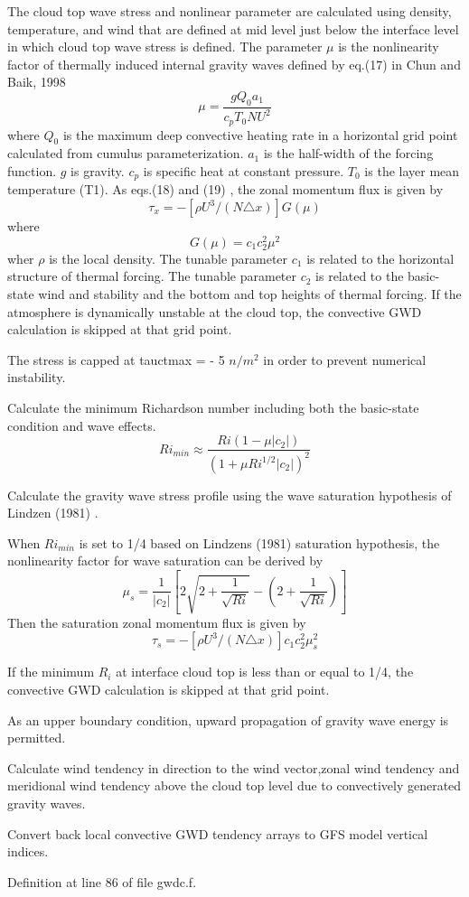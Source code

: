 \begin{DoxyEnumerate}
\begin{DoxyItemize}
\item The cloud top wave stress and nonlinear parameter are calculated using density, temperature, and wind that are defined at mid level just below the interface level in which cloud top wave stress is defined. The parameter $\mu$ is the nonlinearity factor of thermally induced internal gravity waves defined by eq.(17) in Chun and Baik, 1998 \cite{chun_and_baik_1998} \[ \mu=\frac{gQ_{0}a_{1}}{c_{p}T_{0}NU^{2}} \] where $Q_{0}$ is the maximum deep convective heating rate in a horizontal grid point calculated from cumulus parameterization. $a_{1}$ is the half-\/width of the forcing function. $g$ is gravity. $c_{p}$ is specific heat at constant pressure. $T_{0}$ is the layer mean temperature (T1). As eqs.(18) and (19) \cite{chun_and_baik_1998}, the zonal momentum flux is given by \[ \tau_{x}=-[\rho U^{3}/(N\triangle x)]G(\mu) \] where \[ G(\mu)=c_{1}c_2^2 \mu^{2} \] wher $\rho$ is the local density. The tunable parameter $c_1$ is related to the horizontal structure of thermal forcing. The tunable parameter $c_2$ is related to the basic-\/state wind and stability and the bottom and top heights of thermal forcing. If the atmosphere is dynamically unstable at the cloud top, the convective G\+WD calculation is skipped at that grid point.
\item The stress is capped at tauctmax = -\/ 5 $n/m^2$ in order to prevent numerical instability.
\end{DoxyItemize}
\item Calculate the minimum Richardson number including both the basic-\/state condition and wave effects. \[ Ri_{min}\approx\frac{Ri(1-\mu|c_{2}|)}{(1+\mu Ri^{1/2}|c_{2}|)^{2}} \]
\item Calculate the gravity wave stress profile using the wave saturation hypothesis of Lindzen (1981) \cite{lindzen_1981}.
\begin{DoxyItemize}
\item When $Ri_{min}$ is set to 1/4 based on Lindzen\textquotesingle{}s (1981) \cite{lindzen_1981} saturation hypothesis, the nonlinearity factor for wave saturation can be derived by \[ \mu_{s}=\frac{1}{|c_{2}|}[2\sqrt{2+\frac{1}{\sqrt{Ri}}}-(2+\frac{1}{\sqrt{Ri}})] \] Then the saturation zonal momentum flux is given by \[ \tau_{s}=-[\rho U^{3}/(N\triangle x)]c_{1}c_2^2\mu_s^2 \]
\item If the minimum $R_{i}$ at interface cloud top is less than or equal to 1/4, the convective G\+WD calculation is skipped at that grid point.
\item As an upper boundary condition, upward propagation of gravity wave energy is permitted.
\end{DoxyItemize}
\item Calculate wind tendency in direction to the wind vector,zonal wind tendency and meridional wind tendency above the cloud top level due to convectively generated gravity waves.
\item Convert back local convective G\+WD tendency arrays to G\+FS model vertical indices. 
\end{DoxyEnumerate}

Definition at line 86 of file gwdc.\+f.


